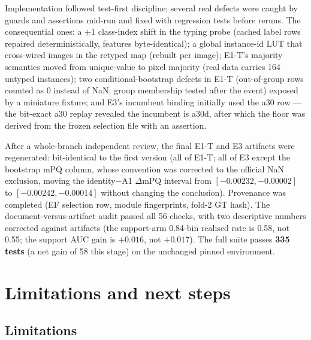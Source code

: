 \documentclass[11pt,a4paper]{article}
\begin{document}
Implementation followed test-first discipline; several real defects were caught by guards and assertions mid-run and fixed with regression tests before reruns. The consequential ones: a $\pm1$ class-index shift in the typing probe (cached label rows repaired deterministically, features byte-identical); a global instance-id LUT that cross-wired images in the retyped map (rebuilt per image); E1-T's majority semantics moved from unique-value to pixel majority (real data carries 164 untyped instances); two conditional-bootstrap defects in E1-T (out-of-group rows counted as 0 instead of NaN; group membership tested after the event) exposed by a miniature fixture; and E3's incumbent binding initially used the a30 row --- the bit-exact a30 replay revealed the incumbent is a30d, after which the floor was derived from the frozen selection file with an assertion.

After a whole-branch independent review, the final E1-T and E3 artifacts were regenerated: bit-identical to the first version (all of E1-T; all of E3 except the bootstrap mPQ column, whose convention was corrected to the official NaN exclusion, moving the identity$-$A1 $\Delta$mPQ interval from $[-0.00232,-0.00002]$ to $[-0.00242,-0.00014]$ without changing the conclusion). Provenance was completed (EF selection row, module fingerprints, fold-2 GT hash). The document-versus-artifact audit passed all 56 checks, with two descriptive numbers corrected against artifacts (the support-arm 0.84-bin realised rate is 0.58, not 0.55; the support AUC gain is $+0.016$, not $+0.017$). The full suite passes \textbf{335 tests} (a net gain of 58 this stage) on the unchanged pinned environment.

\section{Limitations and next steps}

\subsection{Limitations}
\end{document}
